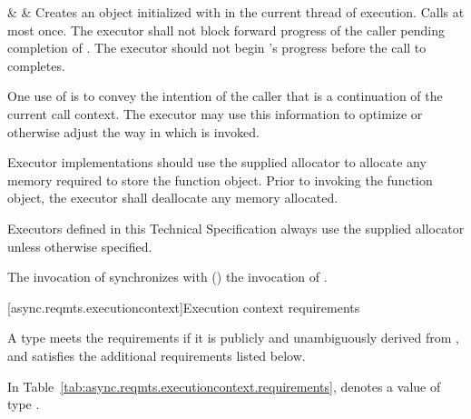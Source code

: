 \begin{libreqtab3}
  &
  &
\effects Creates an object  initialized with  in the current thread of execution. Calls  at most once. The executor shall not block forward progress of the caller pending completion of . The executor should not begin 's progress before the call to  completes. \begin{note} One use of  is to convey the intention of the caller that  is a continuation of the current call context. The executor may use this information to optimize or otherwise adjust the way in which  is invoked. \end{note}  Executor implementations should use the supplied allocator to allocate any memory required to store the function object. Prior to invoking the function object, the executor shall deallocate any memory allocated. \begin{note} Executors defined in this Technical Specification always use the supplied allocator unless otherwise specified. \end{note}\br
\sync The invocation of  synchronizes with () the invocation of .  \\

\end{libreqtab3}



[async.reqmts.executioncontext]{Execution context requirements}

%
\pnum
A type  meets the  requirements if it is publicly and unambiguously derived from , and satisfies the additional requirements listed below.

\pnum
In Table~\ref{tab:async.reqmts.executioncontext.requirements},  denotes a value of type .

